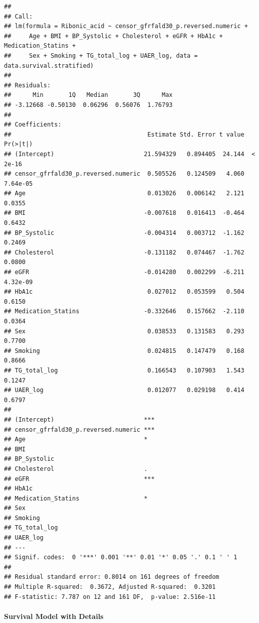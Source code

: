 \documentclass[]{article}
\let\oldparagraph\paragraph
\renewcommand{\paragraph}[1]{\oldparagraph{#1}\mbox{}}
\begin{document}
\begin{verbatim}
## 
## Call:
## lm(formula = Ribonic_acid ~ censor_gfrfald30_p.reversed.numeric + 
##     Age + BMI + BP_Systolic + Cholesterol + eGFR + HbA1c + Medication_Statins + 
##     Sex + Smoking + TG_total_log + UAER_log, data = data.survival.stratified)
## 
## Residuals:
##      Min       1Q   Median       3Q      Max 
## -3.12668 -0.50130  0.06296  0.56076  1.76793 
## 
## Coefficients:
##                                      Estimate Std. Error t value Pr(>|t|)
## (Intercept)                         21.594329   0.894405  24.144  < 2e-16
## censor_gfrfald30_p.reversed.numeric  0.505526   0.124509   4.060 7.64e-05
## Age                                  0.013026   0.006142   2.121   0.0355
## BMI                                 -0.007618   0.016413  -0.464   0.6432
## BP_Systolic                         -0.004314   0.003712  -1.162   0.2469
## Cholesterol                         -0.131182   0.074467  -1.762   0.0800
## eGFR                                -0.014280   0.002299  -6.211 4.32e-09
## HbA1c                                0.027012   0.053599   0.504   0.6150
## Medication_Statins                  -0.332646   0.157662  -2.110   0.0364
## Sex                                  0.038533   0.131583   0.293   0.7700
## Smoking                              0.024815   0.147479   0.168   0.8666
## TG_total_log                         0.166543   0.107903   1.543   0.1247
## UAER_log                             0.012077   0.029198   0.414   0.6797
##                                        
## (Intercept)                         ***
## censor_gfrfald30_p.reversed.numeric ***
## Age                                 *  
## BMI                                    
## BP_Systolic                            
## Cholesterol                         .  
## eGFR                                ***
## HbA1c                                  
## Medication_Statins                  *  
## Sex                                    
## Smoking                                
## TG_total_log                           
## UAER_log                               
## ---
## Signif. codes:  0 '***' 0.001 '**' 0.01 '*' 0.05 '.' 0.1 ' ' 1
## 
## Residual standard error: 0.8014 on 161 degrees of freedom
## Multiple R-squared:  0.3672, Adjusted R-squared:  0.3201 
## F-statistic: 7.787 on 12 and 161 DF,  p-value: 2.516e-11
\end{verbatim}

\hypertarget{survival-model-with-details-1}{%
\paragraph{Survival Model with
Details}\label{survival-model-with-details-1}}
\end{document}

